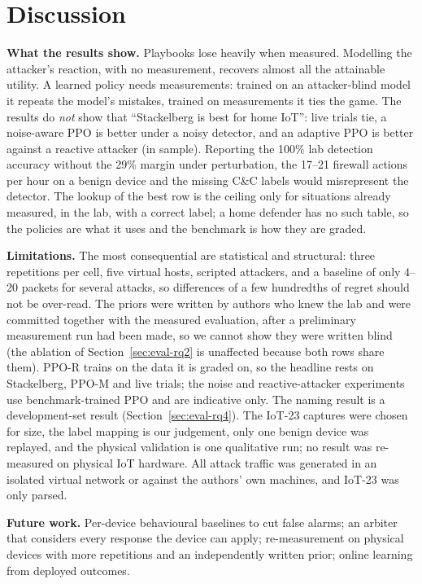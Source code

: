 \documentclass[conference]{IEEEtran}
\begin{document}
\section{Discussion}
\label{sec:discussion}
\textbf{What the results show.} Playbooks lose heavily when measured. Modelling the attacker's reaction, with no measurement, recovers almost all the attainable utility. A learned policy needs measurements: trained on an attacker-blind model it repeats the model's mistakes, trained on measurements it ties the game. The results do \emph{not} show that ``Stackelberg is best for home IoT'': live trials tie, a noise-aware PPO is better under a noisy detector, and an adaptive PPO is better against a reactive attacker (in sample). Reporting the 100\% lab detection accuracy without the 29\% margin under perturbation, the 17--21 firewall actions per hour on a benign device and the missing C\&C labels would misrepresent the detector. The lookup of the best row is the ceiling only for situations already measured, in the lab, with a correct label; a home defender has no such table, so the policies are what it uses and the benchmark is how they are graded.

\textbf{Limitations.} The most consequential are statistical and structural: three repetitions per cell, five virtual hosts, scripted attackers, and a baseline of only 4--20 packets for several attacks, so differences of a few hundredths of regret should not be over-read. The priors were written by authors who knew the lab and were committed together with the measured evaluation, after a preliminary measurement run had been made, so we cannot show they were written blind (the ablation of Section~\ref{sec:eval-rq2} is unaffected because both rows share them). PPO-R trains on the data it is graded on, so the headline rests on Stackelberg, PPO-M and live trials; the noise and reactive-attacker experiments use benchmark-trained PPO and are indicative only. The naming result is a development-set result (Section~\ref{sec:eval-rq4}). The IoT-23 captures were chosen for size, the label mapping is our judgement, only one benign device was replayed, and the physical validation is one qualitative run; no result was re-measured on physical IoT hardware. All attack traffic was generated in an isolated virtual network or against the authors' own machines, and IoT-23 was only parsed.

\textbf{Future work.} Per-device behavioural baselines to cut false alarms; an arbiter that considers every response the device can apply; re-measurement on physical devices with more repetitions and an independently written prior; online learning from deployed outcomes.
\end{document}
